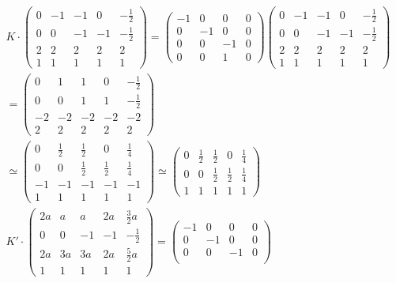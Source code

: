 \begin{gather}
K \cdot 
	\begin{pmatrix}
0&-1&-1&0&-\frac{1}{2}\\
0&0&-1&-1&-\frac{1}{2}\\
2&2&2&2&2\\
1&1&1&1&1
\end{pmatrix}=
	\begin{pmatrix}
		-1&0&0&0\\
		0&-1&0&0\\
		0&0&-1&0\\
		0&0&1&0
	\end{pmatrix}
	\begin{pmatrix}
		0&-1&-1&0&-\frac{1}{2}\\
		0&0&-1&-1&-\frac{1}{2}\\
		2&2&2&2&2\\
		1&1&1&1&1
	\end{pmatrix}\\=
	\begin{pmatrix}
		0&1&1&0&-\frac{1}{2}\\
		0&0&1&1&-\frac{1}{2}\\
		-2&-2&-2&-2&-2\\
		2&2&2&2&2
	\end{pmatrix}\\
	\simeq
	\begin{pmatrix}
		0&\frac{1}{2}&\frac{1}{2}&0&\frac{1}{4}\\
		0&0&\frac{1}{2}&\frac{1}{2}&\frac{1}{4}\\
		-1&-1&-1&-1&-1\\
		1&1&1&1&1
	\end{pmatrix}	
	\simeq
	\begin{pmatrix}
	0&\frac{1}{2}&\frac{1}{2}&0&\frac{1}{4}\\
	0&0&\frac{1}{2}&\frac{1}{2}&\frac{1}{4}\\
	1&1&1&1&1
	\end{pmatrix}\\
K' \cdot 	\begin{pmatrix}
2a&a&a&2a&\frac{3}{2}a\\
0&0&-1&-1&-\frac{1}{2}\\
2a&3a&3a&2a&\frac{5}{2}a\\
1&1&1&1&1
\end{pmatrix}=
	\begin{pmatrix}
		-1&0&0&0\\
		0&-1&0&0\\
		0&0&-1&0\\

\end{pmatrix}
\end{gather}
